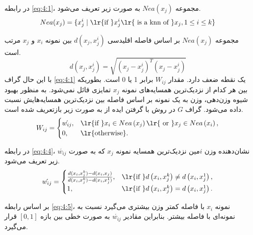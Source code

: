 در رابطه \ref{eq:4:1}، مجموعه $Nea\left(x_j\right)$ به صورت زیر تعریف می‌شود.
\begin{equation}\label{eq:4:2}
Nea(x_j) = \{x^{i}_{j} \mid \textrm{\lr{if }} x^{i}_{j} \textrm{\lr{ is a knn of }} x_{j} ,1 \leq i \leq k \}
\end{equation}

مجموعه $Nea\left(x_j\right)$  بر اساس فاصله اقلیدسی $d(x_{j},x^{i}_{j})$ بین نمونه $x_{i}$ و $x_{j}$  مرتب است.
\begin{equation}\label{eq:4:3}
d(x_{j},x^{i}_{j})= \sqrt{(x_{j} - x^{i}_{j})^{T}(x_{j} - x^{i}_{j})}
\end{equation}
با این حال گراف \ref{eq:4:1} یک نقطه ضعف دارد. مقدار $W_{ij}$ برابر 1 یا 0 است. بطوریکه بین هر کدام از نزدیک‌ترین همسایه‌های نمونه $x_j$ تمایزی قائل نمی‌شود. به منظور بهبود شیوه وزن‌دهی، وزن به یک نمونه بر اساس فاصله بین نزدیک‌ترین همسایه‌هایش نسبت داده می‌شود. گراف $G$ در روش  با گرفتن ایده از \cite{dudani1976,gou2012} به صورت زیر بازتعریف شده است.
\begin{equation}\label{eq:4:4}
W_{ij} =
\begin{cases}
\acute{w_{ij}}, & \textrm{\lr{if }} x_{i} \in Nea\left(x_{j}\right) \textrm{\lr{ or }} x_j \in Nea\left(x_i\right), \\
0, & \textrm{\lr{otherwise}}.
\end{cases}
\end{equation}

در رابطه \ref{eq:4:4}، $\acute{w_{ij}}$  نشان‌دهنده وزن  $i$مین نزدیک‌ترین همسایه نمونه $x_{j}$  که به صورت زیر تعریف می‌شود.
\begin{equation}\label{eq:4:5}
\acute{w_{ij}} =
\begin{cases}
\frac{d(x_{i},x^{k}_{j}) - d(x_{i},x_{j})}{d(x_{i},x^{k}_{j}) - d(x_{i},x^{1}_{j})}, & \textrm{\lr{if }} d\left(x_{i},x^{k}_{j} \right) \neq d\left(x_{i},x^{1}_{j} \right),  \\
1, & \textrm{\lr{if }} d\left(x_{i},x^{k}_{j} \right) = d\left(x_{i},x^{1}_{j} \right).
\end{cases}
\end{equation}

بر اساس رابطه \ref{eq:4:5}، نمونه  $x_{i}$ با فاصله کمتر وزن بیشتری می‌گیرد نسبت به نمونه‌ای با فاصله بیشتر. بنابراین مقادیر $\acute{w_{ij}}$  به صورت خطی بین بازه $\left[0,1\right]$ قرار می‌گیرد.

